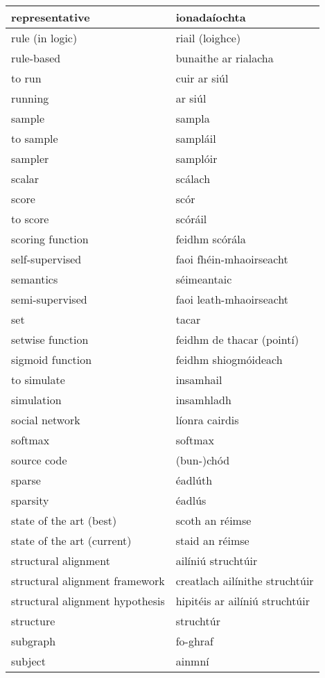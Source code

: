 \begin{longtable}{|l|l|}
		representative&ionadaíochta\\ \hline 
		rule (in logic)&riail (loighce)\\ \hline 
		rule-based&bunaithe ar rialacha\\ \hline 
		to run&cuir ar siúl\\ \hline 
		running&ar siúl\\ \hline 
		sample&sampla\\ \hline 
		to sample&sampláil\\ \hline 
		sampler&samplóir\\ \hline 
		scalar&scálach\\ \hline 
		score&scór\\ \hline 
		to score&scóráil\\ \hline 
		scoring function&feidhm scórála\\ \hline 
		self-supervised&faoi fhéin-mhaoirseacht\\ \hline 
		semantics&séimeantaic\\ \hline 
		semi-supervised&faoi leath-mhaoirseacht\\ \hline 
		set&tacar\\ \hline 
		setwise function&feidhm de thacar (pointí)\\ \hline 
		sigmoid function&feidhm shiogmóideach\\ \hline 
		to simulate&insamhail\\ \hline 
		simulation&insamhladh\\ \hline 
		social network&líonra cairdis\\ \hline 
		softmax&softmax\\ \hline 
		source code&(bun-)chód\\ \hline 
		sparse&éadlúth\\ \hline 
		sparsity&éadlús\\ \hline 
		state of the art (best)&scoth an réimse\\ \hline 
		state of the art (current)&staid an réimse\\ \hline 
		structural alignment&ailíniú struchtúir\\ \hline 
		structural alignment framework&creatlach ailínithe struchtúir\\ \hline 
		structural alignment hypothesis&hipitéis ar ailíniú struchtúir\\ \hline 
		structure&struchtúr\\ \hline 
		subgraph&fo-ghraf\\ \hline 
		subject&ainmní\\ \hline 

\end{longtable}
